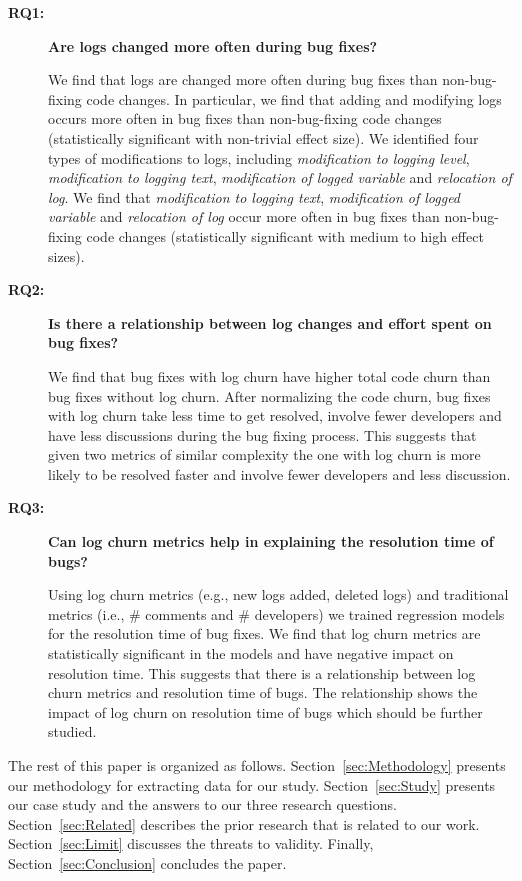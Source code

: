 \begin{description}
\item[\textbf{RQ1:}]\textbf{Are logs changed more often during bug fixes?} 

We find that logs are changed more often during bug fixes than non-bug-fixing code changes. In particular, we find that adding and modifying logs occurs more often in bug fixes than non-bug-fixing code changes (statistically significant with non-trivial effect size). We identified four types of modifications to logs, including \emph{modification to logging level}, \emph{modification to logging text}, \emph{modification of logged variable} and \emph{relocation of log}. We find that \emph{modification to logging text}, \emph{modification of logged variable} and \emph{relocation of log} occur more often in bug fixes than non-bug-fixing code changes (statistically significant with medium to high effect sizes). 



\item[\textbf{RQ2:}]\textbf{Is there a relationship between log changes and effort spent on bug fixes?}

We find that bug fixes with log churn have higher total code churn than bug fixes without log churn. After normalizing the code churn, bug fixes with log churn take less time to get resolved, involve fewer developers and have less discussions during the bug fixing process. This suggests that given two metrics of similar complexity the one with log churn is more likely to be resolved faster and involve fewer developers and less discussion. 


\item[\textbf{RQ3:}]\textbf{Can log churn metrics help in explaining the resolution time of bugs?}

Using log churn metrics (e.g., new logs added, deleted logs) and traditional metrics (i.e., \# comments and \# developers) we trained regression models for the resolution time of bug fixes. We find that log churn metrics are statistically significant in the models and have negative impact on resolution time. This suggests that there is a relationship between log churn metrics and resolution time of bugs. The relationship shows the impact of log churn on resolution time of bugs which should be further studied. 

\end{description}


The rest of this paper is organized as follows. Section~\ref{sec:Methodology} presents our methodology for extracting data for our study. Section~\ref{sec:Study} presents our case study and the answers to our three research questions. Section~\ref{sec:Related} describes the prior research that is related to our work. Section~\ref{sec:Limit}  discusses the threats to validity. Finally, Section~\ref{sec:Conclusion} concludes the paper.


